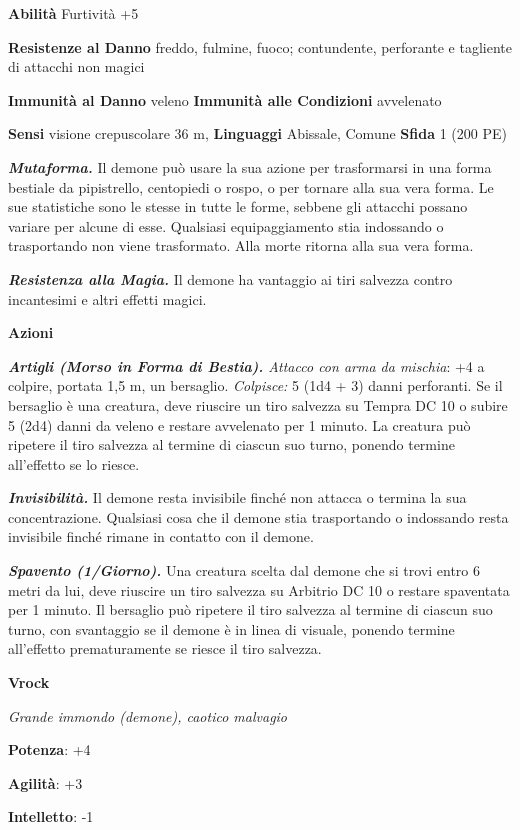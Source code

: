 \begin{multicols}{2}
\textbf{Abilità} Furtività +5

\textbf{Resistenze al Danno} freddo, fulmine, fuoco; contundente,
perforante e tagliente di attacchi non magici

\textbf{Immunità al Danno} veleno \textbf{Immunità alle Condizioni}
avvelenato

\textbf{Sensi} visione crepuscolare 36 m, 
\textbf{Linguaggi} Abissale, Comune \textbf{Sfida} 1 (200 PE)

\emph{\textbf{Mutaforma.}} Il demone può usare la sua azione per
trasformarsi in una forma bestiale da pipistrello, centopiedi o rospo, o
per tornare alla sua vera forma. Le sue statistiche sono le stesse in
tutte le forme, sebbene gli attacchi possano variare per alcune di esse.
Qualsiasi equipaggiamento stia indossando o trasportando non viene
trasformato. Alla morte ritorna alla sua vera forma.

\emph{\textbf{Resistenza alla Magia.}} Il demone ha vantaggio ai tiri
salvezza contro incantesimi e altri effetti magici.

\textbf{Azioni}

\emph{\textbf{Artigli (Morso in Forma di Bestia).} Attacco con arma da
mischia}: +4 a colpire, portata 1,5 m, un bersaglio. \emph{Colpisce:} 5
(1d4 + 3) danni perforanti. Se il bersaglio è una creatura, deve
riuscire un tiro salvezza su Tempra DC 10 o subire 5 (2d4) danni
da veleno e restare avvelenato per 1 minuto. La creatura può ripetere il
tiro salvezza al termine di ciascun suo turno, ponendo termine
all'effetto se lo riesce.

\emph{\textbf{Invisibilità.}} Il demone resta invisibile finché non
attacca o termina la sua concentrazione. Qualsiasi cosa che il demone
stia trasportando o indossando resta invisibile finché rimane in
contatto con il demone.

\emph{\textbf{Spavento (1/Giorno).}} Una creatura scelta dal demone che
si trovi entro 6 metri da lui, deve riuscire un tiro salvezza su Arbitrio DC 10 o restare spaventata per 1 minuto. Il bersaglio può
ripetere il tiro salvezza al termine di ciascun suo turno, con
svantaggio se il demone è in linea di visuale, ponendo termine
all'effetto prematuramente se riesce il tiro salvezza.


\textbf{Vrock}

\emph{Grande immondo (demone), caotico malvagio}

\textbf{Potenza}: +4

\textbf{Agilità}: +3

\textbf{Intelletto}: -1


\end{multicols}
